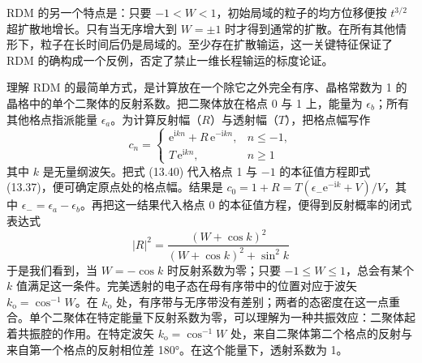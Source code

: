 RDM 的另一个特点是：只要 $-1<W<1$，初始局域的粒子的均方位移便按 $t^{3/2}$ 超扩散地增长。只有当无序增大到 $W=\pm 1$ 时才得到通常的扩散。在所有其他情形下，粒子在长时间后仍是局域的。至少存在扩散输运，这一关键特征保证了 RDM 的确构成一个反例，否定了禁止一维长程输运的标度论证。

理解 RDM 的最简单方式，是计算放在一个除它之外完全有序、晶格常数为 1 的晶格中的单个二聚体的反射系数。把二聚体放在格点 0 与 1 上，能量为 $\epsilon_{b}$；所有其他格点指派能量 $\epsilon_{a}$。为计算反射幅（$R$）与透射幅（$T$），把格点幅写作
\begin{equation*}
c_{n}=\begin{cases}\mathrm{e}^{\mathrm{i}kn}+R\,\mathrm{e}^{-\mathrm{i}kn}, & n\le-1,\\ T\,\mathrm{e}^{\mathrm{i}kn}, & n\ge 1\end{cases}\tag{13.40}
\end{equation*}
其中 $k$ 是无量纲波矢。把式 (13.40) 代入格点 1 与 $-1$ 的本征值方程即式 (13.37)，便可确定原点处的格点幅。结果是 $c_{0}=1+R=T(\epsilon_{-}\mathrm{e}^{-\mathrm{i}k}+V)/V$，其中 $\epsilon_{-}=\epsilon_{a}-\epsilon_{b}$。再把这一结果代入格点 0 的本征值方程，便得到反射概率的闭式表达式
\begin{equation*}
|R|^{2}=\frac{(W+\cos k)^{2}}{(W+\cos k)^{2}+\sin^{2}k}\tag{13.41}
\end{equation*}
于是我们看到，当 $W=-\cos k$ 时反射系数为零；只要 $-1\le W\le 1$，总会有某个 $k$ 值满足这一条件。完美透射的电子态在母有序带中的位置对应于波矢 $k_{\mathrm{o}}=\cos^{-1}W$。在 $k_{\mathrm{o}}$ 处，有序带与无序带没有差别；两者的态密度在这一点重合。单个二聚体在特定能量下反射系数为零，可以理解为一种共振效应：二聚体起着共振腔的作用。在特定波矢 $k_{\mathrm{o}}=\cos^{-1}W$ 处，来自二聚体第二个格点的反射与来自第一个格点的反射相位差 180°。在这个能量下，透射系数为 1。

